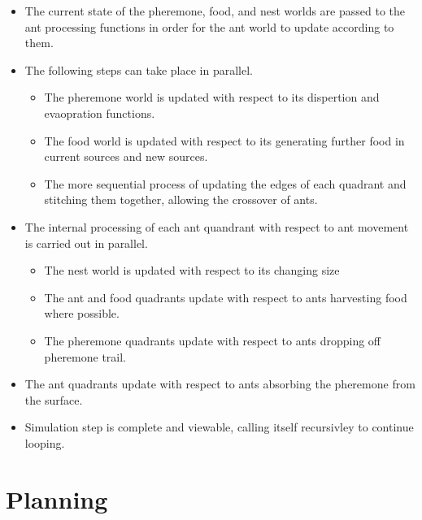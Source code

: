 \documentclass[main.tex]{subfiles}
\begin{document}
\begin{itemize}
        \item The current state of the pheremone, food, and nest worlds are passed to the ant processing functions in order for the ant world to update according to them.
        \item The following steps can take place in parallel.
        \begin{itemize}
                \item The pheremone world is updated with respect to its dispertion and evaopration functions.
                \item The food world is updated with respect to its generating further food in current sources and new sources.
                \item The more sequential process of updating the edges of each quadrant and stitching them together, allowing the crossover of ants.
        \end{itemize}
        
        \item The internal processing of each ant quandrant with respect to ant movement is carried out in parallel.

        \begin{itemize}
                \item The nest world is updated with respect to its changing size 
                \item The ant and food quadrants update with respect to ants harvesting food where possible.
                \item The pheremone quadrants update with respect to ants dropping off pheremone trail.
        \end{itemize}
        \item The ant quadrants update with respect to ants absorbing the pheremone from the surface. 
        \item Simulation step is complete and viewable, calling itself recursivley to continue looping.
\end {itemize}

\section{Planning}
\end{document}
